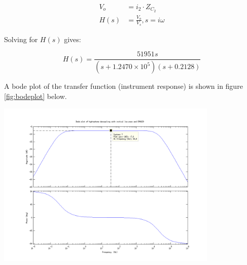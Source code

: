 \documentclass[a4paper]{article}
\begin{document}
\begin{multicols}{2}
\begin{align}
  \label{eqn:vo}
  V_o &= i_2 \cdot Z_{C_2} \\
  H(s) &= \frac{V_o}{V_s}, s = i\omega
\end{align}

Solving for $H(s)$ gives:

\begin{equation}
  H(s) = \frac{51951 s}
  { (s + 1.2470 \times 10^5)
    (s + 0.2128) }
  \label{eqn:transferfunction}
\end{equation}

A bode plot of the transfer function (instrument response) is shown in
figure \ref{fig:bodeplot} below.

\end{multicols}
  \begin{center}
    \includegraphics[width=400px]{bodeplot.png}
  \end{center}
  \label{fig:bodeplot}
\end{document}
